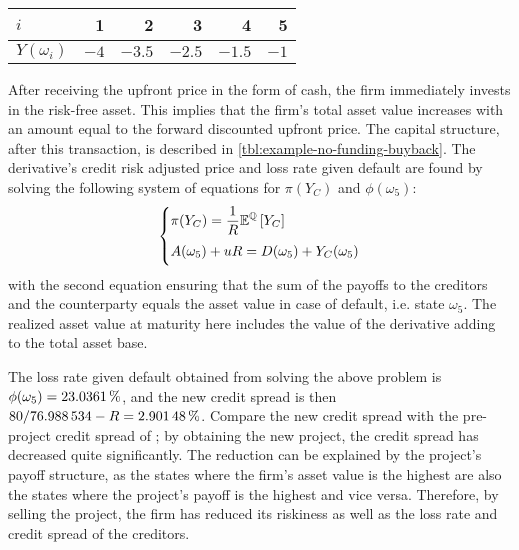 \documentclass[main.tex]{subfiles}
\begin{document}
            \begin{table}[H]
                \centering
                \begin{tabular}{l|rrrrr}
                    $i$ & 1 & 2 & 3 & 4 & 5 \\
                    \hline
                    $Y(\omega_{i})$ & $\num{-4}$ & $\num{-3.5}$ & $\num{-2.5}$ & $\num{-1.5}$ & $\num{-1}$ \\
                \end{tabular}
                \caption{}
                \label{tbl:risky-option-payoff}
            \end{table}

            After receiving the upfront price in the form of cash, the firm immediately invests in the risk-free asset. 
            This implies that the firm's total asset value increases 
            with an amount equal to the forward discounted upfront price. 
            The capital structure, after this transaction, is described in \cref{tbl:example-no-funding-buyback}.
            The derivative's credit risk adjusted price and loss rate given default are found
            by solving the following system of equations for $\pi(Y_C)$ and $\phi(\omega_{5})$:
            \begin{align}
                \left\{\begin{array}{@{}l@{}}
                    \displaystyle
                    \pi(Y_C) = \discountfactor\mathbb{E}^{\rnmeasure}\left[Y_{C}\right]
                    \\[1em]
                    \displaystyle
                    A(\omega_5) + uR = D(\omega_5) + Y_C(\omega_5)
                    \\[0.4em]
                \end{array}\right.
                \label{eqn:no-funding-buyback-default-state}
            \end{align}
            with the second equation ensuring that the 
            sum of the payoffs to the creditors and the counterparty
            equals the asset value in case of default, i.e. state $\omega_5$.
            The realized asset value at maturity here includes the value of the derivative adding to the total asset base.

            The loss rate given default obtained from solving the above problem is 
            $\phi(\omega_{5}) = \pct{0.230361}$, 
            and the new credit spread is then 
            $\num{80}/\num{76.988534} - \grossrfrate = \pct{0.0290148}$.
            Compare the new credit spread with the pre-project credit spread of ;
            by obtaining the new project, the credit spread has decreased quite significantly.
            The reduction can be explained by the project's payoff structure,
            as the states where the firm's asset value is the highest are
            also the states where the project's payoff is the highest and vice versa. 
            Therefore, by selling the project, the firm has reduced its riskiness
            as well as the loss rate and credit spread of the creditors.
\end{document}
